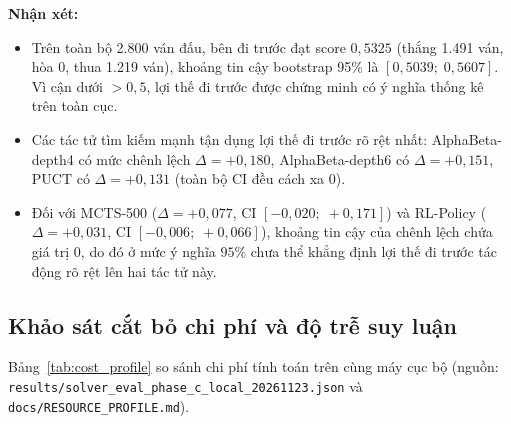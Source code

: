 \documentclass[11pt, a4paper]{article}
\begin{document}
\textbf{Nhận xét:}
\begin{itemize}
    \item Trên toàn bộ 2.800 ván đấu, bên đi trước đạt score $0{,}5325$ (thắng 1.491 ván, hòa 0, thua 1.219 ván), khoảng tin cậy bootstrap 95\% là $[0{,}5039;\; 0{,}5607]$. Vì cận dưới $> 0{,}5$, lợi thế đi trước được chứng minh có ý nghĩa thống kê trên toàn cục.
    \item Các tác tử tìm kiếm mạnh tận dụng lợi thế đi trước rõ rệt nhất: AlphaBeta-depth4 có mức chênh lệch $\Delta = +0{,}180$, AlphaBeta-depth6 có $\Delta = +0{,}151$, PUCT có $\Delta = +0{,}131$ (toàn bộ CI đều cách xa 0).
    \item Đối với MCTS-500 ($\Delta = +0{,}077$, CI $[-0{,}020;\; +0{,}171]$) và RL-Policy ($\Delta = +0{,}031$, CI $[-0{,}006;\; +0{,}066]$), khoảng tin cậy của chênh lệch chứa giá trị 0, do đó ở mức ý nghĩa $95\%$ chưa thể khẳng định lợi thế đi trước tác động rõ rệt lên hai tác tử này.
\end{itemize}

\subsection{Khảo sát cắt bỏ chi phí và độ trễ suy luận}
Bảng~\ref{tab:cost_profile} so sánh chi phí tính toán trên cùng máy cục bộ (nguồn: \texttt{results/solver\_eval\_phase\_c\_local\_20261123.json} và \texttt{docs/RESOURCE\_PROFILE.md}).
\end{document}
